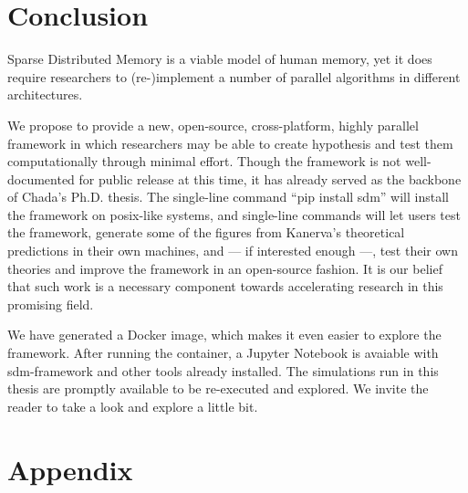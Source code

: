 \chapter{Conclusion}

Sparse Distributed Memory is a viable model of human memory, yet it does require researchers to (re-)implement a number of parallel algorithms in different architectures.

We propose to provide a new, open-source, cross-platform, highly parallel framework in which researchers may be able to create hypothesis and test them computationally through minimal effort. Though the framework is not well-documented for public release at this time, it has already served as the backbone of Chada's Ph.D. thesis. The single-line command ``pip install sdm'' will install the framework on posix-like systems, and single-line commands will let users test the framework, generate some of the figures from Kanerva's theoretical predictions in their own machines, and --- if interested enough ---, test their own theories and improve the framework in an open-source fashion. It is our belief that such work is a necessary component towards accelerating research in this promising field.

We have generated a Docker image, which makes it even easier to explore the framework. After running the container, a Jupyter Notebook is avaiable with sdm-framework and other tools already installed. The simulations run in this thesis are promptly available to be re-executed and explored. We invite the reader to take a look and explore a little bit.


\chapter{Appendix}

%

